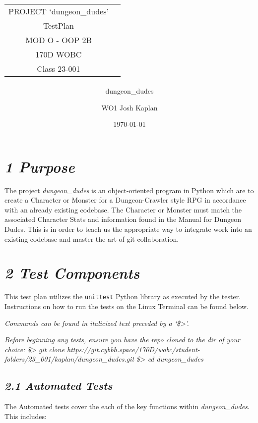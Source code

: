 \documentclass[11pt]{extbook}
\title{%
\begin{tabular}{cl}
PROJECT `dungeon\_dudes'\tabularnewline
\large TestPlan\tabularnewline
\large MOD O - OOP 2B\tabularnewline
\small 170D WOBC\tabularnewline
\small Class 23-001\tabularnewline
\end{tabular}
}
\subtitle{\large dungeon\_dudes}
\author{%
\begin{tabular}{cl}
WO1 Josh Kaplan
\end{tabular}
}
\date{\today}
\newcommand\tab[1][1cm]{\hspace*{#1}}
\begin{document}
\maketitle

\section*{\emph{1 Purpose}}

\tab The project \emph{dungeon\_dudes} is an object-oriented program in Python 
which are to create a Character or Monster for a Dungeon-Crawler style RPG
in accordance with an already existing codebase. The Character or Monster must
match the associated Character Stats and information found in the Manual for 
Dungeon Dudes. This is in order to teach us the appropriate way to integrate 
work into an existing codebase and master the art of git collaboration. 

\section*{\emph{2 Test Components}}

\tab This test plan utilizes the \verb|unittest| Python library as 
executed by the tester. Instructions on how to run the tests on the Linux 
Terminal can be found below. 

\emph{Commands can be found in italicized text preceded by a ‘\$>’.}

\emph{Before beginning any tests, ensure you have the repo cloned to the dir of your choice:} \newline
\emph{\$> git clone https://git.cybbh.space/170D/wobc/student-folders/23\_001/kaplan/dungeon\_dudes.git} \newline
\emph{\$> cd dungeon\_dudes}

\subsection*{\emph{2.1 Automated Tests}}

The Automated tests cover the each of the key functions 
within \emph{dungeon\_dudes}. This includes:
\end{document}
